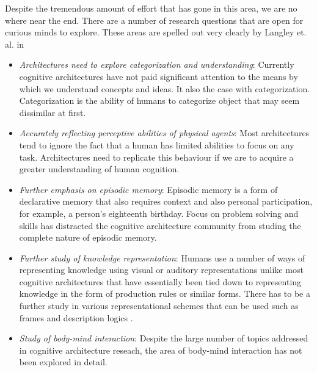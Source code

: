 Despite the tremendous amount of effort that has gone in this area, we
are no where near the end. There are a number of research questions
that are open for curious minds to explore. These areas are spelled
out very clearly by Langley et. al. in \cite{citeulike:4182324}


\begin{itemize}
\item \emph{Architectures need to explore categorization and
    understanding}: Currently cognitive architectures have not paid
  significant attention to the means by which we understand concepts
  and ideas. It also the case with categorization. Categorization is
  the ability of humans to categorize object that may seem dissimilar
  at first. 
  
\item \emph{Accurately reflecting perceptive abilities of physical
    agents}: Most architectures tend to ignore the fact that a human
  has limited abilities to focus on any task. Architectures need to
  replicate this behaviour if we are to acquire a greater
  understanding of human cognition.

  \item \emph{Further emphasis on episodic memory}: Episodic memory is
    a form of declarative memory that also requires context and also
    personal participation\cite{09011999}, for example, a person's
    eighteenth birthday.  Focus on problem solving and skills has
    distracted the cognitive architecture community from studing the
    complete nature of episodic memory.

\item \emph{Further study of knowledge representation}: Humans use a
  number of ways of representing knowledge using visual or auditory
  representations unlike most cognitive architectures that have
  essentially been tied down to representing knowledge in the form of
  production rules or similar forms. There has to be a further study
  in various representational schemes that can be used such as
  frames\cite{Minsky1974a} and description logics
  \cite{nardi-brachman:2003a}. 

\item \emph{Study of body-mind interaction}: Despite the large number
  of topics addressed in cognitive architecture reseach, the area of
  body-mind interaction has not been explored in detail.


\end{itemize}
